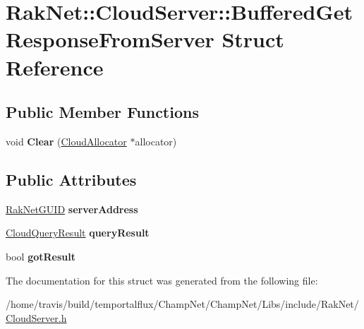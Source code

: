 \hypertarget{struct_rak_net_1_1_cloud_server_1_1_buffered_get_response_from_server}{\section{Rak\-Net\-:\-:Cloud\-Server\-:\-:Buffered\-Get\-Response\-From\-Server Struct Reference}
\label{struct_rak_net_1_1_cloud_server_1_1_buffered_get_response_from_server}
}
\subsection*{Public Member Functions}
\begin{DoxyCompactItemize}
\item 
\hypertarget{struct_rak_net_1_1_cloud_server_1_1_buffered_get_response_from_server_a7154961d997814606a8af598a0a118b8}{void {\bfseries Clear} (\hyperlink{class_rak_net_1_1_cloud_allocator}{Cloud\-Allocator} $\ast$allocator)}\label{struct_rak_net_1_1_cloud_server_1_1_buffered_get_response_from_server_a7154961d997814606a8af598a0a118b8}

\end{DoxyCompactItemize}
\subsection*{Public Attributes}
\begin{DoxyCompactItemize}
\item 
\hypertarget{struct_rak_net_1_1_cloud_server_1_1_buffered_get_response_from_server_ad94e360d36cac5e6daaba33dec5474dc}{\hyperlink{struct_rak_net_1_1_rak_net_g_u_i_d}{Rak\-Net\-G\-U\-I\-D} {\bfseries server\-Address}}\label{struct_rak_net_1_1_cloud_server_1_1_buffered_get_response_from_server_ad94e360d36cac5e6daaba33dec5474dc}

\item 
\hypertarget{struct_rak_net_1_1_cloud_server_1_1_buffered_get_response_from_server_a343ee4a1111974a27fd14f9f09f6311e}{\hyperlink{struct_rak_net_1_1_cloud_query_result}{Cloud\-Query\-Result} {\bfseries query\-Result}}\label{struct_rak_net_1_1_cloud_server_1_1_buffered_get_response_from_server_a343ee4a1111974a27fd14f9f09f6311e}

\item 
\hypertarget{struct_rak_net_1_1_cloud_server_1_1_buffered_get_response_from_server_a6b21398d45780655b0d4d9e4c0d4b2be}{bool {\bfseries got\-Result}}\label{struct_rak_net_1_1_cloud_server_1_1_buffered_get_response_from_server_a6b21398d45780655b0d4d9e4c0d4b2be}

\end{DoxyCompactItemize}


The documentation for this struct was generated from the following file\-:\begin{DoxyCompactItemize}
\item 
/home/travis/build/temportalflux/\-Champ\-Net/\-Champ\-Net/\-Libs/include/\-Rak\-Net/\hyperlink{_cloud_server_8h}{Cloud\-Server.\-h}\end{DoxyCompactItemize}
